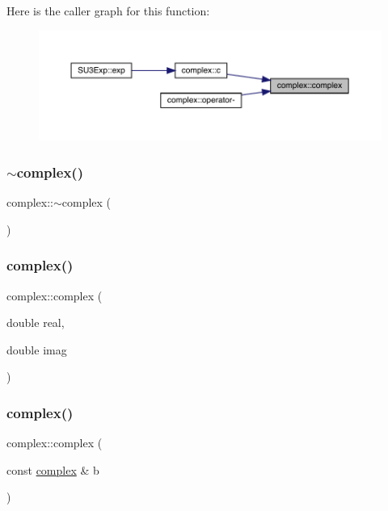 Here is the caller graph for this function\+:\nopagebreak
\begin{figure}[H]
\begin{center}
\leavevmode
\includegraphics[width=350pt]{classcomplex_a1fb8d3affbc54c1ad34a0820b357e194_icgraph}
\end{center}
\end{figure}
\mbox{\label{classcomplex_abd31d1c53fe873fa4ec0fbce50601485}} 
\subsubsection{\texorpdfstring{$\sim$complex()}{~complex()}}
{\footnotesize\ttfamily complex\+::$\sim$complex (\begin{DoxyParamCaption}{ }\end{DoxyParamCaption})}

\mbox{\label{classcomplex_ab8d6f234864954c1ab460984a1e32bd3}} 
\subsubsection{\texorpdfstring{complex()}{complex()}\hspace{0.1cm}{\footnotesize\ttfamily [2/3]}}
{\footnotesize\ttfamily complex\+::complex (\begin{DoxyParamCaption}\item[{double}]{real,  }\item[{double}]{imag }\end{DoxyParamCaption})}

\mbox{\label{classcomplex_a57fa59491a94c3aeeb5b005fed5d0ed4}} 
\subsubsection{\texorpdfstring{complex()}{complex()}\hspace{0.1cm}{\footnotesize\ttfamily [3/3]}}
{\footnotesize\ttfamily complex\+::complex (\begin{DoxyParamCaption}\item[{const \mbox{\hyperlink{classcomplex}{complex}} \&}]{b }\end{DoxyParamCaption})}

